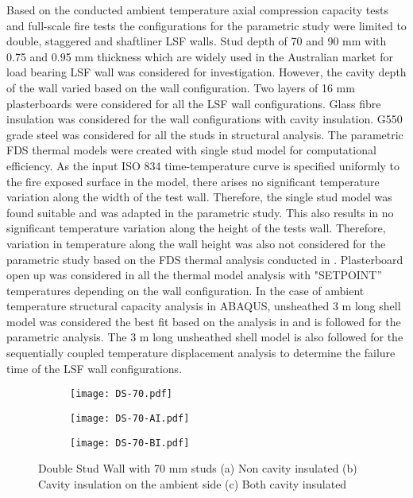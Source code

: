 Based on the conducted ambient temperature axial compression capacity tests and full-scale fire tests the configurations for the parametric study were limited to double, staggered and shaftliner LSF walls. Stud depth of 70 and 90 mm with 0.75 and 0.95 mm thickness which are widely used in the Australian market for load bearing LSF wall was considered for investigation. However, the cavity depth of the wall varied based on the wall configuration. Two layers of 16 mm plasterboards were considered for all the LSF wall configurations. Glass fibre insulation was considered for the wall configurations with cavity insulation. G550 grade steel was considered for all the studs in structural analysis. The parametric FDS thermal models were created with single stud model for computational efficiency. As the input ISO 834 time-temperature curve is specified uniformly to the fire exposed surface in the model, there arises no significant temperature variation along the width of the test wall. Therefore, the single stud model was found suitable and was adapted in the parametric study. This also results in no significant temperature variation along the height of the tests wall. Therefore, variation in temperature along the wall height was also not considered for the parametric study based on the FDS thermal analysis conducted in . Plasterboard open up was considered in all the thermal model analysis with "SETPOINT'' temperatures depending on the wall configuration. In the case of ambient temperature structural capacity analysis in ABAQUS, unsheathed 3 m long shell model was considered the best fit based on the analysis in  and is followed for the parametric analysis. The 3 m long unsheathed shell model is also followed for the sequentially coupled temperature displacement analysis to determine the failure time of the LSF wall configurations.
\begin{figure}[!htbp]
	\centering
	\begin{subfigure}[b]{0.2\textwidth}
		\centering
		\texttt{[image: DS-70.pdf]}
		\caption{}
		\label{subfig:DS-70}
	\end{subfigure}
	\begin{subfigure}[b]{0.2\textwidth}
		\centering
		\texttt{[image: DS-70-AI.pdf]}
		\caption{}
		\label{subfig:DS-70-AI}
	\end{subfigure}
	\begin{subfigure}[b]{0.2\textwidth}
		\centering
		\texttt{[image: DS-70-BI.pdf]}
		\caption{}
		\label{subfig:DS-70-BI}
	\end{subfigure}
	   \caption{Double Stud Wall with 70 mm studs (a) Non cavity insulated (b) Cavity insulation on the ambient side (c) Both cavity insulated}
	   \label{fig:DS-70-parametric}
\end{figure} 
